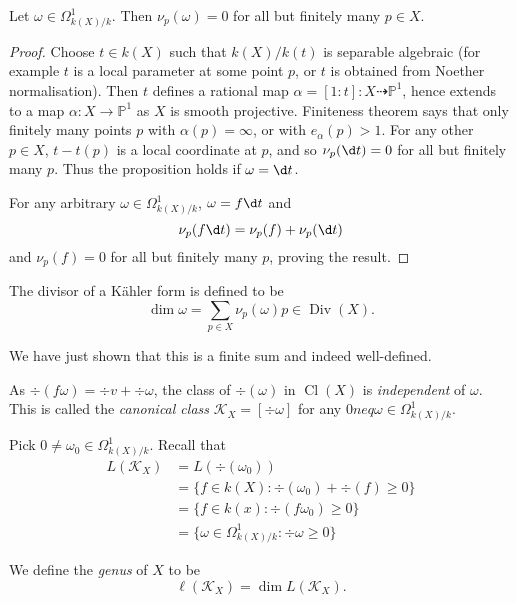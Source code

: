 \documentclass[a4paper]{article}
\DeclareMathOperator{\Cl}{Cl}
\renewcommand*{\P}{\mathbb{P}}
\newcommand{\rational}{\dashrightarrow} %
\DeclareMathOperator{\Div}{Div} %
\begin{document}
\begin{proposition}
  Let \(\omega \in \Omega^1_{k(X)/k}\). Then \(\nu_p(\omega) = 0\) for all but finitely many \(p \in X\).
\end{proposition}

\begin{proof}
  Choose \(t \in k(X)\) such that \(k(X)/k(t)\) is separable algebraic (for example \(t\) is a local parameter at some point \(p\), or \(t\) is obtained from Noether normalisation). Then \(t\) defines a rational map \(\alpha = [1: t]: X \rational \P^1\), hence extends to a map \(\alpha: X \to \P^1\) as \(X\) is smooth projective. Finiteness theorem says that only finitely many points \(p\) with \(\alpha(p) = \infty\), or with \(e_\alpha(p) > 1\). For any other \(p \in X\), \(t - t(p)\) is a local coordinate at \(p\), and so \(\nu_p(\d t) = 0\) for all but finitely many \(p\). Thus the proposition holds if \(\omega = \d t\).

  For any arbitrary \(\omega \in \Omega^1_{k(X)/k}\), \(\omega = f \d t\) and
  \[
    \nu_p(f \d t) = \nu_p(f) + \nu_p(\d t)
  \]
  and \(\nu_p(f) = 0\) for all but finitely many \(p\), proving the result.
\end{proof}

\begin{definition}
  The divisor of a Kähler form is defined to be
  \[
    \dim \omega = \sum_{p \in X} \nu_p(\omega) p \in \Div(X).
  \]
\end{definition}
We have just shown that this is a finite sum and indeed well-defined.

As \(\div (f\omega) = \div v + \div \omega\), the class of \(\div(\omega)\) in \(\Cl(X)\) is \emph{independent} of \(\omega\). This is called the \emph{canonical class} \(\mathcal K_X = [\div \omega]\) for any \(0 neq \omega \in \Omega^1_{k(X)/k}\).

Pick \(0 \neq \omega_0 \in \Omega^1_{k(X)/k}\). Recall that
\begin{align*}
  L(\mathcal K_X)
  &= L(\div(\omega_0)) \\
  &= \{f \in k(X): \div(\omega_0) + \div (f) \geq 0\} \\
  &= \{f \in k(x): \div (f \omega_0) \geq 0\} \\
  &= \{\omega \in \Omega^1_{k(X)/k}: \div \omega \geq 0\}
\end{align*}

\begin{definition}[genus]
  We define the \emph{genus} of \(X\) to be
  \[
    \ell(\mathcal K_X) = \dim L(\mathcal K_X).
  \]
\end{definition}
\end{document}
